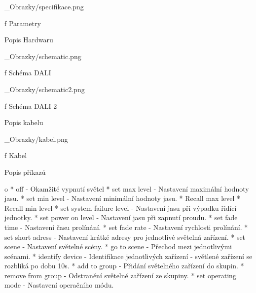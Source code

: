 \medskip {}
\picw=12cm _Obrazky/specifikace.png
\caption/f Parametry
\medskip

\sec Popis Hardwaru

\medskip {}
\picw=12cm _Obrazky/schematic.png
\caption/f Schéma DALI
\medskip

\medskip {}
\picw=12cm _Obrazky/schematic2.png
\caption/f Schéma DALI 2
\medskip



\sec Popis kabelu

\medskip {}
\picw=10cm _Obrazky/kabel.png
\caption/f Kabel
\medskip


\medskip
\sec Popis příkazů

\begitems \style o
* off - Okamžité vypnutí světel
* set max level - Nastavení maximální hodnoty jasu.
* set min level - Nastavení minimální hodnoty jasu.
* Recall max level
* Recall min level
* set system failure level - Nastavení jasu při výpadku řidící jednotky.
* set power on level - Nastavení jasu při zapnutí proudu.
* set fade time - Nastavení času prolínání.
* set fade rate - Nastavení rychlosti prolínání.
* set short adress - Nastavení krátké adresy pro jednotlivé světelná zařízení.
* set scene - Nastavení světelné scény.
* go to scene - Přechod mezi jednotlivými scénami.
* identify device - Identifikace jednotlivých zařízení - světlené zařízení se rozbliká po dobu 10s.
* add to group - Přidání světelného zařízení do skupin.
* remove from group - Odstranění světelné zařízení ze skupiny.
* set operating mode - Nastavení operačního módu.
\enditems
\medskip

